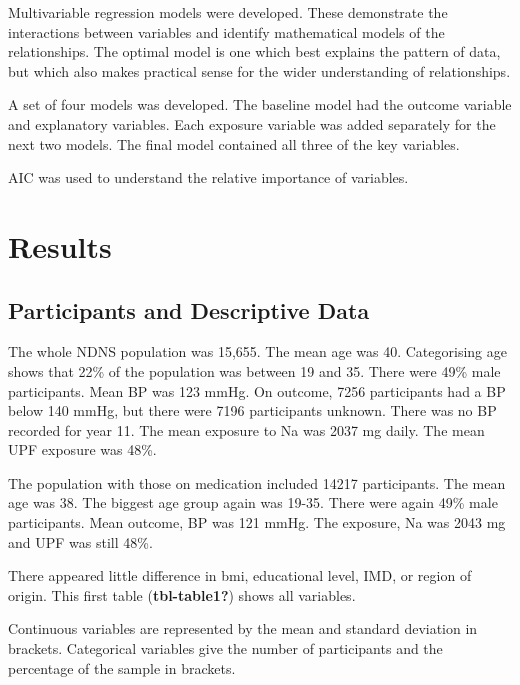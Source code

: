 \documentclass[
]{article}
\begin{document}
Multivariable regression models were developed. These demonstrate the
interactions between variables and identify mathematical models of the
relationships. The optimal model is one which best explains the pattern
of data, but which also makes practical sense for the wider
understanding of relationships.

A set of four models was developed. The baseline model had the outcome
variable and explanatory variables. Each exposure variable was added
separately for the next two models. The final model contained all three
of the key variables.

AIC was used to understand the relative importance of variables.

\newpage

\hypertarget{results}{%
\section{Results}\label{results}}

\hypertarget{participants-and-descriptive-data}{%
\subsection{Participants and Descriptive
Data}\label{participants-and-descriptive-data}}

The whole NDNS population was 15,655. The mean age was 40. Categorising
age shows that 22\% of the population was between 19 and 35. There were
49\% male participants. Mean BP was 123 mmHg. On outcome, 7256
participants had a BP below 140 mmHg, but there were 7196 participants
unknown. There was no BP recorded for year 11. The mean exposure to Na
was 2037 mg daily. The mean UPF exposure was 48\%.

The population with those on medication included 14217 participants. The
mean age was 38. The biggest age group again was 19-35. There were again
49\% male participants. Mean outcome, BP was 121 mmHg. The exposure, Na
was 2043 mg and UPF was still 48\%.

There appeared little difference in bmi, educational level, IMD, or
region of origin. This first table (\textbf{tbl-table1?}) shows all
variables.

Continuous variables are represented by the mean and standard deviation
in brackets. Categorical variables give the number of participants and
the percentage of the sample in brackets.
\end{document}
